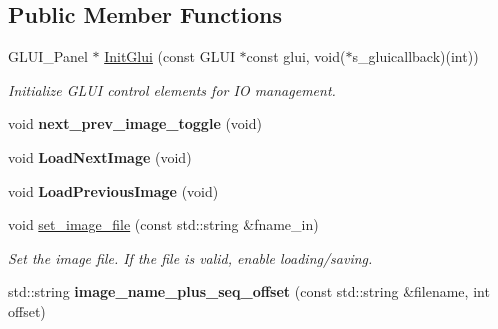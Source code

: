 \subsection*{Public Member Functions}
\begin{DoxyCompactItemize}
\item 
G\+L\+U\+I\+\_\+\+Panel $\ast$ \hyperlink{classimage__tools_1_1MIAIOManager_a02267caa7b3b9746d45e5f89138c1376}{Init\+Glui} (const G\+L\+UI $\ast$const glui, void($\ast$s\+\_\+gluicallback)(int))
\begin{DoxyCompactList}\small\item\em Initialize G\+L\+UI control elements for IO management. \end{DoxyCompactList}\item 
void {\bfseries next\+\_\+prev\+\_\+image\+\_\+toggle} (void)\hypertarget{classimage__tools_1_1MIAIOManager_adfc0fb87bc75b56011f9d0a6411d5bf1}{}\label{classimage__tools_1_1MIAIOManager_adfc0fb87bc75b56011f9d0a6411d5bf1}

\item 
void {\bfseries Load\+Next\+Image} (void)\hypertarget{classimage__tools_1_1MIAIOManager_a8ad6f03e7984fa304912fba271e9e5fd}{}\label{classimage__tools_1_1MIAIOManager_a8ad6f03e7984fa304912fba271e9e5fd}

\item 
void {\bfseries Load\+Previous\+Image} (void)\hypertarget{classimage__tools_1_1MIAIOManager_a103bf5248fbe511a83b3db5a704f3418}{}\label{classimage__tools_1_1MIAIOManager_a103bf5248fbe511a83b3db5a704f3418}

\item 
void \hyperlink{classimage__tools_1_1MIAIOManager_a209180ddcfe3bf43d8fd7c6635391ea4}{set\+\_\+image\+\_\+file} (const std\+::string \&fname\+\_\+in)
\begin{DoxyCompactList}\small\item\em Set the image file. If the file is valid, enable loading/saving. \end{DoxyCompactList}\item 
std\+::string {\bfseries image\+\_\+name\+\_\+plus\+\_\+seq\+\_\+offset} (const std\+::string \&filename, int offset)\hypertarget{classimage__tools_1_1MIAIOManager_ada4fae71b72e3a28ba40ffbc24ef8683}{}\label{classimage__tools_1_1MIAIOManager_ada4fae71b72e3a28ba40ffbc24ef8683}

\end{DoxyCompactItemize}

